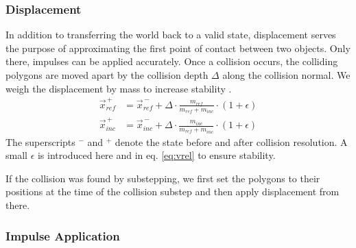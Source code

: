 \subsubsection{Displacement}

In addition to transferring the world back to a valid state, displacement serves the purpose of approximating the first point of contact between two objects.
Only there, impulses can be applied accurately.
Once a collision occurs, the colliding polygons are moved apart by the collision depth $\Delta$ along the collision normal.
We weigh the displacement by mass to increase stability \cite{wheelerCD}.
\begin{align}
  \vec{x}_{ref}^{\,+} &= \vec{x}_{ref}^{\,-} + \Delta \cdot \frac{m_{ref}}{m_{ref} + m_{inc}} \cdot (1+\epsilon)\\
  \vec{x}_{inc}^{\,+} &= \vec{x}_{inc}^{\,-} + \Delta \cdot \frac{m_{inc}}{m_{ref} + m_{inc}} \cdot (1+\epsilon)
\end{align}
The superscripts $^-$ and $^+$ denote the state before and after collision resolution.
A small $\epsilon$ is introduced here and in eq. \ref{eq:vrel} to ensure stability.

If the collision was found by substepping, we first set the polygons to their positions at the time of the collision substep and then apply displacement from there. 

\subsubsection{Impulse Application}

